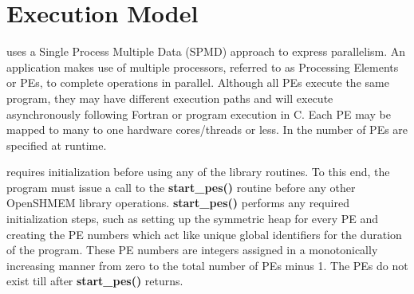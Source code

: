 %   
    

\section{Execution Model}
\openshmem uses a Single Process Multiple Data (SPMD) approach to express
parallelism.  An \openshmem application makes use of multiple processors,
referred to as Processing Elements or PEs, to complete operations
in parallel. Although all PEs execute the same program, they may have different execution paths and will execute asynchronously following Fortran or program execution in C. Each PE may be mapped to many to one hardware cores/threads or less. In \openshmem the number of PEs are specified at runtime.

\openshmem requires initialization before using any of the library
routines. To this end, the program must  issue a call to the \textbf{start\_pes()}
routine before any other OpenSHMEM library operations. \textbf{start\_pes()} performs any required initialization
steps, such as setting up the symmetric heap for every PE and creating
the PE numbers which act like unique global identifiers for the duration of the program. These PE numbers are integers assigned in a monotonically
increasing manner from zero to the total number of PEs minus 1. The PEs do not exist till after \textbf{start\_pes()} returns.

